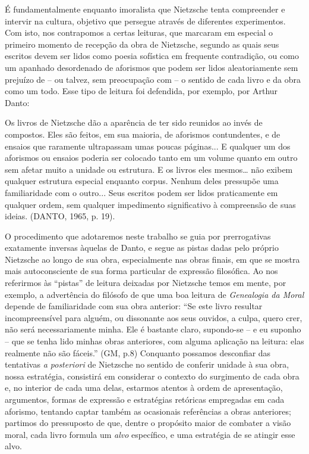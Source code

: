\documentclass[
	12pt,				%
	openright,			%
	oneside,			%
	a4paper,			%
	english,			%
	french,				%
	spanish,			%
	brazil				%
	]{abntex2}
\begin{document}
É fundamentalmente enquanto imoralista que Nietzsche tenta compreender e intervir na cultura, objetivo que persegue através de diferentes experimentos. Com isto, nos contrapomos a certas leituras, que marcaram em especial o primeiro momento de recepção da obra de Nietzsche, segundo as quais seus escritos devem ser lidos como poesia sofística em frequente contradição, ou como um apanhado desordenado de aforismos que podem ser lidos aleatoriamente sem prejuízo de – ou talvez, sem preocupação com – o sentido de cada livro e da obra como um todo. Esse tipo de leitura foi defendida, por exemplo, por Arthur Danto: 

\begin{citacao}
Os livros de Nietzsche dão a aparência de ter sido reunidos ao invés de compostos. Eles são feitos, em sua maioria, de aforismos contundentes, e de ensaios que raramente ultrapassam umas poucas páginas... E qualquer um dos aforismos ou ensaios poderia ser colocado tanto em um volume quanto em outro sem afetar muito a unidade ou estrutura. E os livros eles mesmos… não exibem qualquer estrutura especial enquanto corpus. Nenhum deles pressupõe uma familiaridade com o outro... Seus escritos podem ser lidos praticamente em qualquer ordem, sem qualquer impedimento significativo à compreensão de suas ideias. (DANTO, 1965, p. 19).
 \end{citacao} 

	O procedimento que adotaremos neste trabalho se guia por prerrogativas exatamente inversas àquelas de Danto, e segue as pistas dadas pelo próprio Nietzsche ao longo de sua obra, especialmente nas obras finais, em que se mostra mais autoconsciente de sua forma particular de expressão filosófica. Ao nos referirmos às “pistas” de leitura deixadas por Nietzsche temos em mente, por exemplo, a advertência do filósofo de que uma boa leitura de \textit{Genealogia da Moral} depende de familiaridade com sua obra anterior: “Se este livro resultar incompreensível para alguém, ou dissonante aos seus ouvidos, a culpa, quero crer, não será necessariamente minha. Ele é bastante claro, supondo-se – e eu suponho – que se tenha lido minhas obras anteriores, com alguma aplicação na leitura: elas realmente não são fáceis.” (GM, p.8) Conquanto possamos desconfiar das tentativas \textit{a posteriori} de Nietzsche no sentido de conferir unidade à sua obra, nossa estratégia, consistirá em considerar o contexto do surgimento de cada obra e, no interior de cada uma delas, estarmos atentos à ordem de apresentação, argumentos, formas de expressão e estratégias retóricas empregadas em cada aforismo, tentando captar também as ocasionais referências a obras anteriores; partimos do pressuposto de que, dentre o propósito maior de combater a visão moral, cada livro formula um \textit{alvo} específico, e uma estratégia de se atingir esse alvo.
\end{document}
